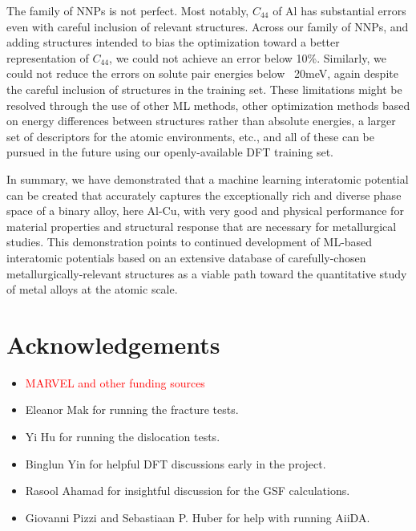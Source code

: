 \documentclass{article}
\begin{document}
The family of NNPs is not perfect.  Most notably, $C_{44}$ of Al has substantial errors even with careful inclusion of relevant structures.
Across our family of NNPs, and adding structures intended to bias the optimization toward a better representation of $C_{44}$, we could not achieve an error below 10\%.  Similarly, we could not reduce the errors on solute pair energies below ~20meV, again despite the careful inclusion of structures in the training set.  These limitations might be resolved through the use of other ML methods, other optimization methods based on energy differences between structures rather than absolute energies, a larger set of descriptors for the atomic environments, etc., and all of these can be pursued in the future using our openly-available DFT training set.

In summary, we have demonstrated that a machine learning interatomic potential can be created that accurately captures the exceptionally rich and diverse phase space of a binary alloy, here Al-Cu, with very good and physical performance for material properties and structural response that are necessary for metallurgical studies.  This demonstration points to continued development of ML-based interatomic potentials based on an extensive database of carefully-chosen metallurgically-relevant structures as a viable path toward the quantitative study of metal alloys at the atomic scale.

\section{Acknowledgements}
\begin{itemize}
    \item \textcolor{red}{MARVEL and other funding sources}
    \item Eleanor Mak for running the fracture tests.
    \item Yi Hu for running the dislocation tests.
    \item Binglun Yin for helpful DFT discussions early in the project.
    \item Rasool Ahamad for insightful discussion for the GSF calculations.
    \item Giovanni Pizzi and Sebastiaan P. Huber for help with running AiiDA. 
\end{itemize}

\newpage
  
\end{document}
